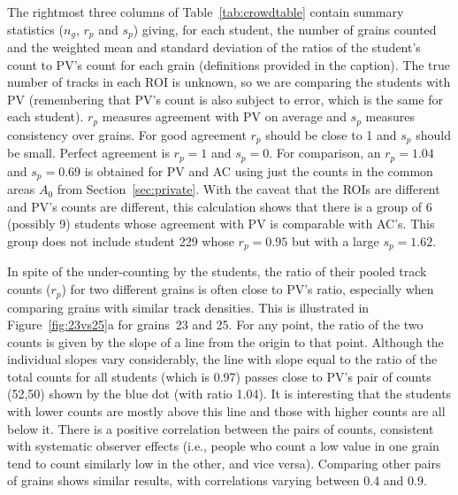 \documentclass[gchron, manuscript]{copernicus}
\begin{document}
The rightmost three columns of Table~\ref{tab:crowdtable} contain
summary statistics ($n_g$, $r_p$ and $s_p$) giving, for each student,
the number of grains counted and the weighted mean and standard
deviation of the ratios of the student's count to PV's count for each
grain (definitions provided in the caption). The true number of tracks
in each ROI is unknown, so we are comparing the students with PV
(remembering that PV's count is also subject to error, which is the
same for each student). $r_p$ measures agreement with PV on average
and $s_p$ measures consistency over grains. For good agreement $r_p$
should be close to 1 and $s_p$ should be small.  Perfect agreement is
$r_p = 1$ and $s_p = 0$. For comparison, an $r_p = 1.04$ and $s_p =
0.69$ is obtained for PV and AC using just the counts in the common
areas $A_0$ from Section~\ref{sec:private}. With the caveat that the
ROIs are different and PV's counts are different, this calculation
shows that there is a group of 6 (possibly 9) students whose agreement
with PV is comparable with AC's. This group does not include student
229 whose $r_p = 0.95$ but with a large $s_p = 1.62$.\medskip

In spite of the under-counting by the students, the ratio of their
pooled track counts ($r_p$) for two different grains is often close to
PV's ratio, especially when comparing grains with similar track
densities. This is illustrated in Figure~\ref{fig:23vs25}a for
grains~23 and 25.  For any point, the ratio of the two counts is given
by the slope of a line from the origin to that point. Although the
individual slopes vary considerably, the line with slope equal to the
ratio of the total counts for all students (which is 0.97) passes
close to PV's pair of counts (52,50) shown by the blue dot (with ratio
1.04). It is interesting that the students with lower counts are
mostly above this line and those with higher counts are all below it.
There is a positive correlation between the pairs of counts,
consistent with systematic observer effects (i.e., people who count a
low value in one grain tend to count similarly low in the other, and
vice versa). Comparing other pairs of grains shows similar results,
with correlations varying between 0.4 and 0.9.\medskip
\end{document}
